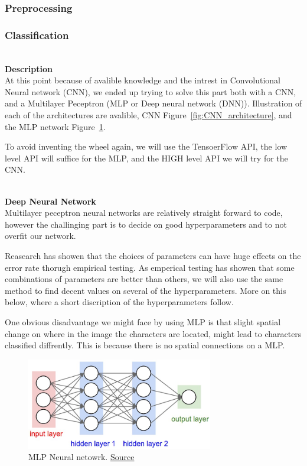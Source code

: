 \documentclass[11pt,a4paper,english]{article}
\begin{document}
\subsubsection{Preprocessing}


\subsubsection{Classification}
\noindent \\ \textbf{Description}
\noindent \\ At this point because of avalible knowledge and the intrest in
Convolutional Neural network (CNN), we ended up trying to solve this part
both with a CNN, and a Multilayer Peceptron (MLP or Deep neural network (DNN)).
Illustration of each of the architectures are avalible, CNN Figure~\ref{fig:CNN_architecture},
and the MLP network Figure~\ref{fig:neural_net2}. \par
To avoid inventing the wheel again, we will use the TensoerFlow API, the low
level API will suffice for the MLP, and the HIGH level API we will try for the
CNN.

\noindent \\ \textbf{Deep Neural Network}
\noindent \\ Multilayer peceptron neural networks are relatively straight
forward to code, however the challinging part is to decide on good
hyperparameters and to not overfit our network. \par
Reasearch has showen that the choices of parameters can have huge effects on
the error rate thorugh empirical testing. As emperical testing has showen that
some combinations of parameters are better than others, we will also use the
same method to find decent values on several of the hyperparameters. More on
this below, where a short discription of the hyperparameters follow. \par
One obvious disadvantage we might face by using MLP is that slight spatial
change on where in the image the characters are located, might lead to
characters classified diffrently. This is because there is no spatial
connections on a MLP.

\begin{figure}[H]
  \centering
  \includegraphics[height=4cm]{res/neural_net2.jpeg}
  \caption{MLP Neural netowrk. \href{http://cs231n.github.io/neural-networks-1/}{Source}}
  \label{fig:neural_net2}
\end{figure}
\end{document}
